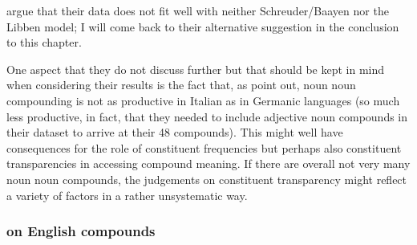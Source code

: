 \citet{MarelliandLuzzatti:2012} argue that their data does not fit
well with neither Schreuder/\-Baayen nor the Libben model; I will come back
to their alternative suggestion in the conclusion to this chapter.

One aspect that they do not discuss further but that should be kept in mind when considering their results
is the fact that, as \citet[647]{MarelliandLuzzatti:2012} point out,
noun noun compounding is not as productive  in Italian as in Germanic 
languages (so much less productive, in fact, that they needed to include adjective noun compounds in
their dataset to arrive at their 48 compounds).%
This might well have
consequences for the role of constituent frequencies but perhaps also
constituent transparencies in accessing compound meaning. If there are
overall not very many noun noun compounds, the judgements on constituent
transparency might reflect a variety of factors in a rather
unsystematic way.

\subsubsection{\citet{El-Bialy_etal:2013} on English compounds}
\label{sec:El-Bialy2013}


